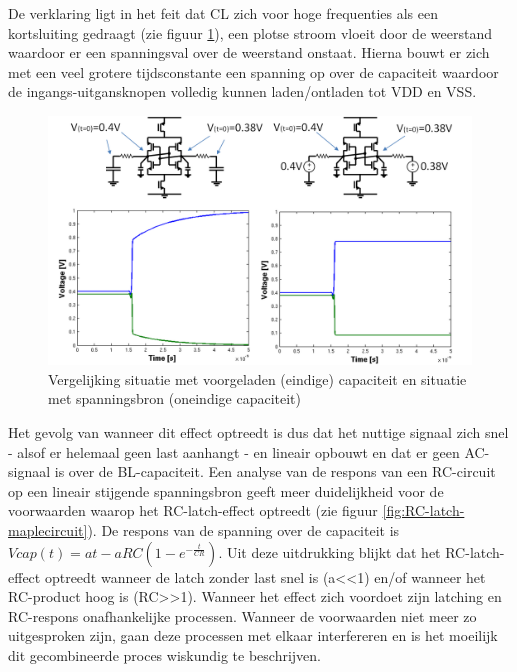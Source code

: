 De verklaring ligt in het feit dat CL zich voor hoge frequenties als een kortsluiting gedraagt (zie figuur \ref{fig:RC-latch-explain}), een plotse stroom vloeit door de weerstand waardoor er een spanningsval over de weerstand onstaat. Hierna bouwt er zich met een veel grotere tijdsconstante een spanning op over de capaciteit waardoor de ingangs-uitgansknopen volledig kunnen laden/ontladen tot VDD en VSS.
\begin{figure}
  \centering
  \includegraphics[width=\textwidth]{../fig/hfdstk-sensamp-RC-latch-explain.png}
  \caption[Invloed capaciteit op RC-latch effect]{Vergelijking situatie met voorgeladen (eindige) capaciteit en situatie met spanningsbron (oneindige capaciteit)}
  \label{fig:RC-latch-explain}
\end{figure}
Het gevolg van wanneer dit effect optreedt is dus dat het nuttige signaal zich snel - alsof er helemaal geen last aanhangt - en lineair opbouwt en dat er geen AC-signaal is over de BL-capaciteit. Een analyse van de respons van een RC-circuit op een lineair stijgende spanningsbron geeft meer duidelijkheid voor de voorwaarden waarop het RC-latch-effect optreedt (zie figuur \ref{fig:RC-latch-maplecircuit}). De respons van de spanning over de capaciteit is $Vcap(t) =  at - aRC(1-e^{-{\frac {t}{CR}}})$. Uit deze uitdrukking blijkt dat het RC-latch-effect optreedt wanneer de latch zonder last snel is (a<<1) en/of wanneer het RC-product hoog is (RC>>1).
Wanneer het effect zich voordoet zijn latching en RC-respons onafhankelijke processen. Wanneer de voorwaarden niet meer zo uitgesproken zijn, gaan deze processen met elkaar interfereren en is het moeilijk dit gecombineerde proces wiskundig te beschrijven.
